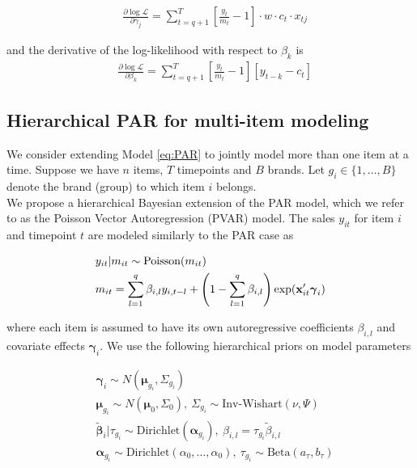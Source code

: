 \documentclass{article}
\begin{document}
\begin{align*}
    & \frac{\partial{\log\mathcal{L}}}{\partial\gamma_j} = \sum_{t = q + 1}^T \left[ \frac{y_t}{m_t} - 1\right] \cdot w \cdot c_t \cdot x_{tj}
\end{align*}

\noindent and the derivative of the log-likelihood with respect to $\beta_k$ is
\begin{align*}
    & \frac{\partial{\log\mathcal{L}}}{\partial\beta_k} = \sum_{t = q + 1}^T \left[ \frac{y_t}{m_t} - 1\right] \left[ y_{t-k} - c_t\right]
\end{align*}


\subsection{Hierarchical PAR for multi-item modeling}

\noindent We consider extending Model \ref{eq:PAR} to jointly model more than one item at a time. Suppose we have $n$ items, $T$ timepoints and $B$ brands. Let $g_i \in \{1,\ldots,B\}$ denote the brand (group) to which item $i$ belongs. \\

\noindent We propose a hierarchical Bayesian extension of the PAR model, which we refer to as the Poisson Vector Autoregression (PVAR) model. The sales $y_{it}$ for item $i$ and timepoint $t$ are modeled similarly to the PAR case as

\begin{align}
    & y_{it} | m_{it} \sim \text{Poisson}(m_{it}) \label{eq:PVAR} \\
    & m_{it} = \sum_{l=1}^q \beta_{i,l} y_{i,t-l}+\left(1-\sum_{l=1}^q \beta_{i,l} \right) \exp(\mathbf{x}_{it}' \boldsymbol{\gamma}_i) \notag
\end{align}

\noindent where each item is assumed to have its own autoregressive coefficients $\beta_{i,l}$ and covariate effects $\boldsymbol{\gamma}_i$. We use the following hierarchical priors on model parameters

\begin{align*}
    & \boldsymbol{\gamma}_i \sim N(\boldsymbol{\mu}_{g_i}, \Sigma_{g_i}) \\
    & \boldsymbol{\mu}_{g_i} \sim N(\boldsymbol{\mu}_0, \Sigma_0), \ \Sigma_{g_i} \sim \text{Inv-Wishart}(\nu, \Psi) \\
    & \tilde{\boldsymbol{\beta}}_i | \tau_{g_i} \sim \text{Dirichlet}(\boldsymbol{\alpha}_{g_i}), \ \beta_{i,l}=\tau_{g_i} \tilde{\beta}_{i,l} \\
    & \boldsymbol{\alpha}_{g_i} \sim \text{Dirichlet}(\alpha_0,\ldots,\alpha_0), \ \tau_{g_i} \sim \text{Beta}(a_{\tau}, b_{\tau})
\end{align*}
\end{document}
